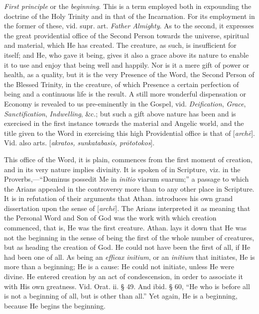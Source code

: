 \xsection{[Arche]}

\emph{First principle} or the \emph{beginning}.
This is a term employed both in expounding the doctrine of the Holy
Trinity and in that of the Incarnation. For its employment in the
former of these, vid. supr. art. \emph{Father Almighty}. As to the
second, it expresses the great providential office of the Second
Person towards the universe, spiritual and material, which He has
created. The creature, as such, is insufficient for itself; and He,
who gave it being, gives it also a grace above its nature to enable it
to use and enjoy that being well and happily. Nor is it a mere gift of
power or health, as a quality, but it is the very Presence of the
Word, the Second Person of the Blessed Trinity, in the creature, of
which Presence a certain perfection of being and a continuous life is
the result. A still more wonderful dispensation or Economy is revealed
to us pre-eminently in the Gospel, vid. \emph{Deification}, \emph{Grace},
\emph{Sanctification}, \emph{Indwelling}, \&c.; but such a gift
above nature has been and is exercised in the first instance towards
the material and Angelic world, and the title given to the Word in
exercising this high Providential office is that of [\emph{arch\={e}}].
Vid. also arts. [\emph{akratos, sunkatabasis, pr\={o}totokos}].

This office of the Word, it is plain, commences
from the first moment of creation, and in its very nature implies
divinity. It is spoken of in Scripture, viz. in the
Proverbs,—“Dominus possedit Me in \emph{initio} viarum suarum;”
a passage to which the Arians appealed in the controversy more than to
any other place in Scripture. It is in refutation of their arguments
that Athan. introduces his own grand dissertation upon the sense of [\emph{arch\={e}}].
The Arians interpreted it as meaning that the Personal Word and Son of
God was the work with which creation commenced, that is, He was the
first creature. Athan. lays it down that He was not the beginning in
the sense of being the first of the whole number of creatures, but as
heading the creation of God. He could not have been the first of all,
if He had been one of all. As being an \emph{efficax initium}, or an \emph{initium}
that initiates, He is more than a beginning; He is a cause: He could
not initiate, unless He were divine. He entered creation by an act of
condescension, in order to associate it with His own greatness. Vid.
Orat. ii. § 49. And ibid. § 60, “He who is before all is not a
beginning of all, but is other than all.” Yet again, He is a
beginning, because He begins the beginning.


